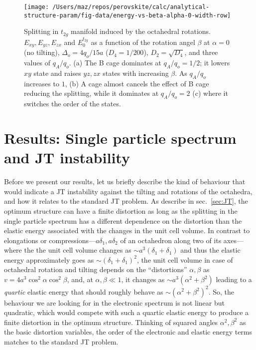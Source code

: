 \documentclass[a4paper,prb,twocolumn]{revtex4-1}  %
\begin{document}
\begin{figure}[htbp]
\begin{center}
\texttt{[image: /Users/maz/repos/perovskite/calc/analytical-structure-param/fig-data/energy-vs-beta-alpha-0-width-row]}
\caption{
Splitting in $t_{2g}$ manifold induced by the
octahedral rotations.
$E_{xy},E_{yz},E_{zx}$ 
and $E_0^{t_{2g}}$
as a function of the rotation angel $\beta$
at $\alpha=0$ (no tilting),
$\Delta_o=4q_o/15a$ ($D_4=1/200$), $D_2=\sqrt{D_4}$,
and three values of $q_A/q_o$.
(a)
The B cage dominates at $q_A/q_o=1/2$;
it lowers $xy$ state and raises $yz,zx$ states
with increasing $\beta$.
As $q_A/q_o$ increases to $1$, 
(b)
A cage almost cancels the effect of B cage reducing the splitting,
while it dominates at $q_A/q_o=2$ (c) where it switches the order of the states. 
}
\label{fig:t2g-alpha0}
\end{center}
\end{figure}



\section{Results: Single particle spectrum and JT instability}
\label{sec:results}
 
 

Before we present our results,
let us briefly describe 
the kind of behaviour that would indicate a JT instability 
against the tilting and rotations of the octahedra,
and how it relates to the standard JT problem.
As describe in sec.~\ref{sec:JT},
the optimum structure can have a finite distortion
as long as 
the splitting in the single particle spectrum has a different dependence on the distortion
than the elastic energy associated with the changes in the unit cell volume.
In contrast to 
elongations or 
compressions---$a\delta_1,a\delta_2$ 
of an octahedron along two of its axes---where the 
 the unit cell volume changes
as $\sim a^3\left(\delta_1+\delta_1\right)$
and thus the elastic energy approximately goes
as $\sim\left(\delta_1+\delta_1\right)^2$,
the unit cell volume
in case of octahedral rotation and tilting
 depends on the ``distortions'' $\alpha,\beta$ 
as ${v=4a^3 \cos ^2\alpha \cos ^2\beta}$,
and, at $\alpha,\beta\ll1$,
it changes as $\sim a^3\left(\alpha ^2+\beta ^2\right)$
leading to a \emph{quartic} elastic energy that should roughly behave as
$\sim\left(\alpha ^2+\beta ^2\right)^2$.
So, the behaviour we are looking for in the electronic spectrum 
is not linear
but quadratic, 
which would compete with such a quartic elastic energy
 to produce a finite distortion in the optimum structure.
Thinking of squared angles 
$\alpha ^2,\beta ^2$
as the basic distortion variables,
the order of the electronic and elastic energy terms
matches to the standard JT problem.
\end{document}
